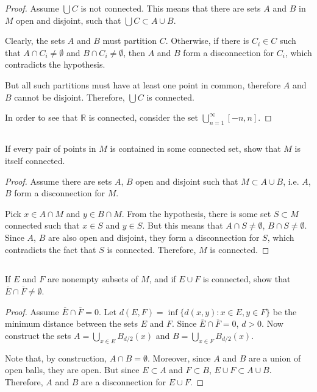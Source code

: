 \begin{proof}
Assume $\bigcup C$ is not connected. This means that there are sets $A$ and $B$ in $M$ open and disjoint, such that $\bigcup C \subset A \cup B$.

Clearly, the sets $A$ and $B$ must partition $C$. Otherwise, if there is $C_i \in C$ such that $A \cap C_i \neq \emptyset$ and $B \cap C_i \neq \emptyset$, then $A$ and $B$ form a disconnection for $C_i$, which contradicts the hypothesis.

But all such partitions must have at least one point in common, therefore $A$ and $B$ cannot be disjoint. Therefore, $\bigcup C$ is connected.

In order to see that $\mathbb{R}$ is connected, consider the set $\bigcup_{n=1}^\infty [-n,n]$.

\end{proof}


\subsection{} If every pair of points in $M$ is contained in some connected set, show that $M$ is itself connected.

\begin{proof}
Assume there are sets $A$, $B$ open and disjoint such that $M \subset A \cup B$, i.e. $A$, $B$ form a disconnection for $M$.

Pick $x \in A \cap M$ and $y \in B \cap M$. From the hypothesis, there is some set $S \subset M$ connected such that $x \in S$ and $y \in S$. But this means that $A \cap S \neq \emptyset$, $B \cap S \neq \emptyset$. Since $A$, $B$ are also open and disjoint, they form a disconnection for $S$, which contradicts the fact that $S$ is connected.
Therefore, $M$ is connected.


\end{proof}


\subsection{} If $E$ and $F$ are nonempty subsets of $M$, and if $E \cup F$ is connected, show that $\overline{E} \cap \overline{F} \neq \emptyset$. 

\begin{proof}
Assume $\overline{E} \cap \overline{F} = 0$. Let $d(E,F) = \inf\{d(x,y): x \in E, y\in F\}$ be the minimum distance between the sets $E$ and $F$. Since $\overline{E} \cap \overline{F} = 0$, $d > 0$. Now construct the sets $A = \bigcup_{x\in E} B_{d/2}(x)$ and $B = \bigcup_{x\in F} B_{d/2}(x)$.

Note that, by construction, $A \cap B = \emptyset$. Moreover, since $A$ and $B$ are a union of open balls, they are open. But since $E \subset A$ and $F \subset B$, $E \cup F \subset A \cup B$. Therefore, $A$ and $B$ are a disconnection for $E \cup F$. 

\end{proof}

